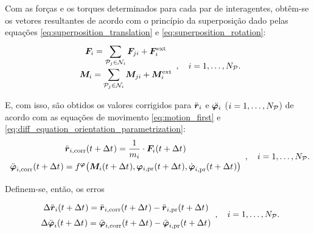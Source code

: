 Com as forças e os torques determinados para cada par de interagentes, obtêm-se os vetores resultantes de acordo com o princípio da superposição dado pelas equações \eqref{eq:superposition_translation} e \eqref{eq:superposition_rotation}:
\begin{equation*}
	\def\arraystretch{1.5}
	\begin{array}{c}
		\resultingForcei = \dsum_{\particlej\in\ineighborhood{i}}\forceji + \external\forcei\\
		\resultingTorquei = \dsum_{\particlej\in\ineighborhood{i}}\torqueji + \external\torquei
	\end{array}, \quad i = 1, \dotsc, \numberOfParticles.
\end{equation*}

E, com isso, são obtidos os valores corrigidos para \(\accelerationi\) e \(\deriv{2}{\orientationi}\) (\(i=1,\dots,N_{\mathcal{P}}\)) de acordo com as equações de movimento \eqref{eq:motion_first} e \eqref{eq:diff_equation_orientation_parametrization}:
\begin{equation*}
	\def\arraystretch{1.5}
	\begin{array}{c}
		\accelerationicorr\pqty{t+\Dt} = \dfrac{1}{\massi}\cdot\resultingForcei\pqty{t+\Dt} \\
		\dorientationicorr{2}\pqty{t+\Dt} = \eqFor{\orientation}\pqty{\resultingTorquei\pqty{t+\Dt}, \orientationipr\pqty{t+\Dt}, \dorientationipr{1}\pqty{t+\Dt}}
	\end{array}, \quad i = 1, \dotsc, \numberOfParticles.
\end{equation*}

Definem-se, então, os erros
\begin{equation*}
	\def\arraystretch{1.5}
	\begin{array}{c}
		\Delta \accelerationi\pqty{t+\Dt} = \accelerationicorr\pqty{t+\Dt} - \accelerationipr\pqty{t+\Dt} \\
		\Delta \dorientationi{2}\pqty{t+\Dt} = \dorientationicorr{2}\pqty{t+\Dt} - \dorientationipr{2}\pqty{t+\Dt} \\
	\end{array}, \quad i = 1, \dotsc, \numberOfParticles.
\end{equation*}

